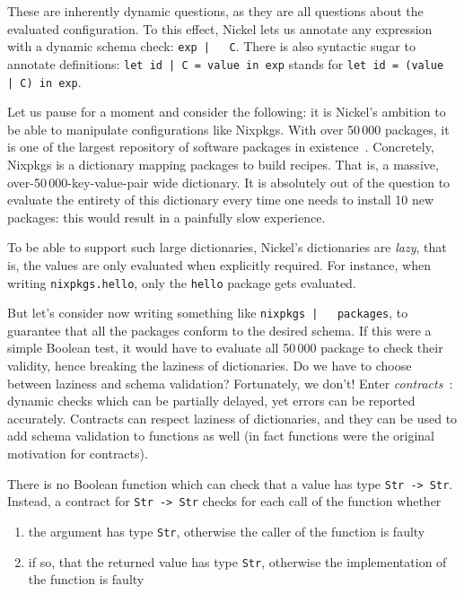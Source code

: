 \documentclass[sigplan,10pt]{acmart}
\newcommand{\unsure}[2][1=]{}
\newcommand{\nickel}[1]{\lstinline[language=nickel]{#1}}
\begin{document}
These are inherently dynamic questions, as they are all questions
about the evaluated configuration. To this effect, Nickel lets us
annotate any expression with a dynamic schema check: \nickel{exp |
  C}. There is also syntactic sugar to annotate definitions:
\nickel{let id | C = value in exp} stands for \nickel{let id = (value
  | C) in exp}.\unsure{This point used to be made, do we want to
  reinsert it? However, Nickel programs are of a special kind: they are usually
simple, terminating programs that run on fixed inputs. Correctness errors will
show up at evaluation anyway, or will not matter (dead code).}

Let us pause for a moment and consider the following: it is Nickel's
ambition to be able to manipulate configurations like Nixpkgs. With
over 50\,000 packages, it is one of the largest repository of software
packages in existence~\cite{repology}. Concretely, Nixpkgs is a
dictionary mapping packages to build recipes. That is, a massive,
over-50\,000-key-value-pair wide dictionary. It is absolutely out of the
question to evaluate the entirety of this dictionary every time one
needs to install 10 new packages: this would result in a painfully
slow experience.

To be able to support such large dictionaries, Nickel's dictionaries
are \emph{lazy}, that is, the values are only evaluated when
explicitly required. For instance, when writing
\hbox{\nickel{nixpkgs.hello},} only the \nickel{hello} package gets
evaluated.

But let's consider now writing something like \nickel{nixpkgs |
  packages}, to guarantee that all the packages conform to the desired
schema. If this were a simple Boolean test, it would have to evaluate
all 50\,000 package to check their validity, hence breaking the
laziness of dictionaries. Do we have to choose between laziness and
schema validation? Fortunately, we don't! Enter
\emph{contracts}~\cite{FindlerFelleisenHOContracts}: dynamic checks
which can be partially delayed, yet errors can be reported
accurately. Contracts can respect laziness of dictionaries, and they
can be used to add schema validation to functions as well (in fact
functions were the original motivation for contracts).

There is no Boolean function which can check that a value has type
\nickel{Str -> Str}. Instead, a contract for \nickel{Str -> Str}
checks for each call of the function whether
\begin{enumerate}
\item the argument has type \nickel{Str}, otherwise the caller of the
  function is faulty
\item if so, that the returned value has type \nickel{Str}, otherwise
  the implementation of the function is faulty
\end{enumerate}
\end{document}
